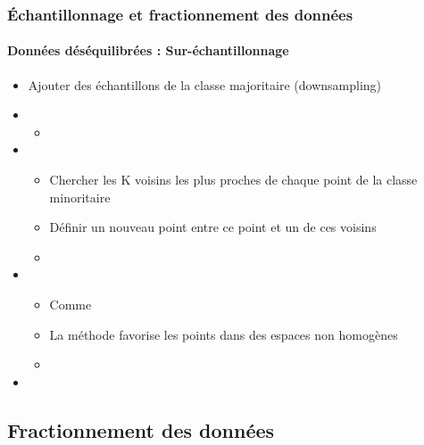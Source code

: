 \documentclass[xcolor=table]{beamer}
\begin{document}
\begin{frame}
	\frametitle{Échantillonnage et fractionnement des données}
	\framesubtitle{Données déséquilibrées : Sur-échantillonnage}
	
	\begin{itemize}
		\item Ajouter des échantillons de la classe majoritaire (downsampling)
		\item {}
		\begin{itemize}
			\item {}
		\end{itemize}
		\item {}
		\begin{itemize}
			\item Chercher les K voisins les plus proches de chaque point de la classe minoritaire
			\item Définir un nouveau point entre ce point et un de ces voisins
			\item {}
		\end{itemize}
		\item {}
		\begin{itemize}
			\item Comme 
			\item La méthode favorise les points dans des espaces non homogènes
			\item {}
		\end{itemize}
		\item {}
	\end{itemize}
	
\end{frame}

\subsection{Fractionnement des données}
\end{document}
